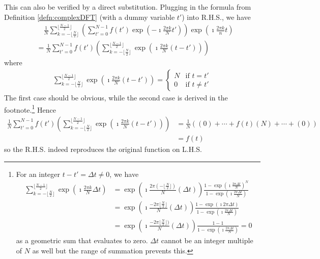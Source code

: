 This can also be verified by a direct substitution. Plugging in the formula from Definition \ref{defn:complexDFT} (with a dummy variable $t'$) into R.H.S., we have
\begin{align*}
&\quad \frac{1}{N}\sum_{k= -\lfloor \frac{N}{2} \rfloor}^{\lfloor \frac{N-1}{2} \rfloor} \left(\sum_{t'=0}^{N-1} f(t')\exp(-\imath\frac{2\pi k}{N}t')\right) \exp(\imath\frac{2\pi k}{n}t) \\
&= \frac{1}{N} \sum_{t'=0}^{N-1} f(t') \left(\sum_{k= -\lfloor \frac{N}{2} \rfloor}^{\lfloor \frac{N-1}{2} \rfloor} \exp(\imath\frac{2\pi k}{N}(t-t'))\right)
\end{align*}
where
\begin{align}
\sum_{k= -\lfloor \frac{N}{2} \rfloor}^{\lfloor \frac{N-1}{2} \rfloor} \exp(\imath\frac{2\pi k}{N}(t-t')) = 
\begin{cases}
N & \text{if $t = t'$} \\
0 & \text{if $t \neq t'$}
\end{cases} \label{eqn:DFTdoublesum}
\end{align}
The first case should be obvious, while the second case is derived in the footnote.\footnote{
For an integer $t - t' = \Delta t \neq 0$, we have
\begin{align*}
\sum_{k= -\lfloor \frac{N}{2} \rfloor}^{\lfloor \frac{N-1}{2} \rfloor} \exp(\imath\frac{2\pi k}{N}\Delta t) 
&= \exp(\imath\frac{2\pi (-\lfloor \frac{N}{2} \rfloor)}{N}(\Delta t)) \frac{1 - \exp(\imath\frac{2\pi \Delta t}{N})^N}{1 - \exp(\imath\frac{2\pi \Delta t}{N})} \\
&= \exp(\imath\frac{-2\pi \lfloor \frac{N}{2} \rfloor}{N}(\Delta t)) \frac{1 - \exp(\imath 2\pi \Delta t)}{1 - \exp(\imath\frac{2\pi \Delta t}{N})} \\
&= \exp(\imath\frac{-2\pi \lfloor \frac{N}{2} \rfloor)}{N}(\Delta t)) \frac{1 - 1}{1 - \exp(\imath\frac{2\pi \Delta t}{N})} = 0
\end{align*}
as a geometric sum that evaluates to zero. $\Delta t$ cannot be an integer multiple of $N$ as well but the range of summation prevents this.} Hence
\begin{align*}
\frac{1}{N} \sum_{t'=0}^{N-1} f(t') \left(\sum_{k= -\lfloor \frac{N}{2} \rfloor}^{\lfloor \frac{N-1}{2} \rfloor} \exp(\imath\frac{2\pi k}{N}(t-t'))\right) &= \frac{1}{N} ((0) + \cdots + f(t) (N) + \cdots + (0)) \\
&= f(t)   
\end{align*}
so the R.H.S. indeed reproduces the original function on L.H.S.

